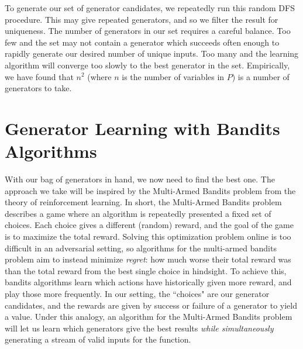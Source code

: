 \documentclass[sigconf,nonacm,review,anonymous]{acmart}
\begin{document}
      

      
      

To generate our set of generator candidates, we repeatedly run this random DFS procedure.
This may give repeated generators, and so we filter the result for uniqueness.
The number of generators in our set requires a careful
balance. Too few and the set may not contain a generator which succeeds often
enough to rapidly generate our desired number of unique inputs. Too many and the
learning algorithm will converge too slowly to the best generator in the set.
Empirically, we have found that $n^2$ (where $n$ is the number of variables in
$P$) is a number of generators to take.

\section{Generator Learning with Bandits Algorithms}
\label{sec:bandits}
With our bag of generators in hand, we now need to find the best one. The
approach we take will be inspired by the Multi-Armed Bandits
\cite{gittins1979bandit} problem from the theory of reinforcement learning. In short, the Multi-Armed
Bandits problem describes a game where an algorithm is repeatedly presented
a fixed set of choices. Each choice gives a different (random) reward, and the
goal of the game is to maximize the total reward. Solving this optimization problem
online is too difficult in an adversarial setting, so algorithms for the multi-armed
bandits problem aim to instead minimize \emph{regret}: how much worse their total reward
was than the total reward from the best single choice in hindsight. To achieve this, bandits algorithms
learn which actions have historically given more reward, and play those more frequently.
In our setting, the ``choices" are our
generator candidates, and the rewards are given by success or failure of a
generator to yield a value. Under this analogy, an algorithm for the Multi-Armed
Bandits problem will let us learn which generators give the best results
\textit{while simultaneously} generating a stream of valid inputs for the
function.
\end{document}
